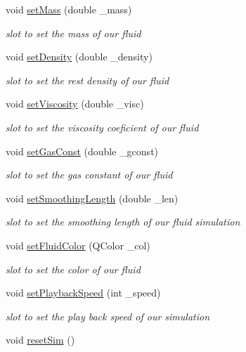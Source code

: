 \begin{DoxyCompactItemize}
void \hyperlink{class_fluid_prop_dock_widget_ae4ee0f4372a699416af91c0b111e95fe}{set\-Mass} (double \-\_\-mass)
\begin{DoxyCompactList}\small\item\em slot to set the mass of our fluid \end{DoxyCompactList}\item 
void \hyperlink{class_fluid_prop_dock_widget_af8a936150aa411f15498bce8c8bd409f}{set\-Density} (double \-\_\-density)
\begin{DoxyCompactList}\small\item\em slot to set the rest density of our fluid \end{DoxyCompactList}\item 
void \hyperlink{class_fluid_prop_dock_widget_a473ce1156c2ab118e6af5d99ec700764}{set\-Viscosity} (double \-\_\-visc)
\begin{DoxyCompactList}\small\item\em slot to set the viscosity coeficient of our fluid \end{DoxyCompactList}\item 
void \hyperlink{class_fluid_prop_dock_widget_aa9cb10cd748f9bce2f751e535bc5a286}{set\-Gas\-Const} (double \-\_\-gconst)
\begin{DoxyCompactList}\small\item\em slot to set the gas constant of our fluid \end{DoxyCompactList}\item 
void \hyperlink{class_fluid_prop_dock_widget_a04366783099838b9a2b364ecd3d53da3}{set\-Smoothing\-Length} (double \-\_\-len)
\begin{DoxyCompactList}\small\item\em slot to set the smoothing length of our fluid simulation \end{DoxyCompactList}\item 
void \hyperlink{class_fluid_prop_dock_widget_aa17ebb5265733ed6d0bb6d7f5305c687}{set\-Fluid\-Color} (Q\-Color \-\_\-col)
\begin{DoxyCompactList}\small\item\em slot to set the color of our fluid \end{DoxyCompactList}\item 
void \hyperlink{class_fluid_prop_dock_widget_a6264d4d89eeeb8adf5bec124598fbcf1}{set\-Playback\-Speed} (int \-\_\-speed)
\begin{DoxyCompactList}\small\item\em slot to set the play back speed of our simulation \end{DoxyCompactList}\item 
\hypertarget{class_fluid_prop_dock_widget_aba723bc2dc92241efbde8434ab3f711b}{void \hyperlink{class_fluid_prop_dock_widget_aba723bc2dc92241efbde8434ab3f711b}{reset\-Sim} ()}\label{class_fluid_prop_dock_widget_aba723bc2dc92241efbde8434ab3f711b}


\end{DoxyCompactItemize}
